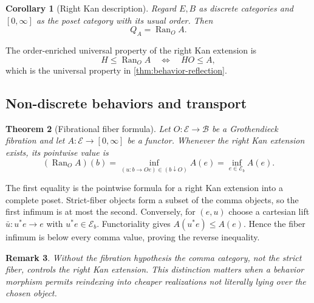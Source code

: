\documentclass[12pt,a4paper,twoside]{extarticle}
\makeatletter
\theoremstyle{compactplain}
\newtheorem{theorem}{Theorem}[section]
\newtheorem{corollary}[theorem]{Corollary}
\theoremstyle{compactdef}
\newtheorem{remark}[theorem]{Remark}
\renewenvironment{proof}[1][\proofname]{\par\pushQED{\qed}\normalfont
  \topsep2pt\trivlist\item[\hskip\labelsep\bfseries #1\@addpunct{.}]\ignorespaces}
 {\popQED\endtrivlist\@endpefalse}
\newcommand{\Ran}{\operatorname{Ran}}
\makeatother
\begin{document}
\begin{corollary}[Right Kan description]
Regard $E,B$ as discrete categories and $[0,\infty]$ as the poset category with its usual order.  Then
\[
  Q_A=\Ran_O A.
\]
\end{corollary}
\begin{proof}
The order-enriched universal property of the right Kan extension is
\[
  H\le\Ran_OA\quad\Longleftrightarrow\quad HO\le A,
\]
which is the universal property in \cref{thm:behavior-reflection}.
\end{proof}

\subsection{Non-discrete behaviors and transport}
\begin{theorem}[Fibrational fiber formula]\label{thm:fibrational-reflection}
Let $O:\mathcal E\to\mathcal B$ be a Grothendieck fibration and let $A:\mathcal E\to[0,\infty]$ be a functor.  Whenever the right Kan extension exists, its pointwise value is
\[
 (\Ran_OA)(b)
 =\inf_{(u:b\to Oe)\in(b\downarrow O)}A(e)
 =\inf_{e\in\mathcal E_b}A(e).
\]
\end{theorem}
\begin{proof}
The first equality is the pointwise formula for a right Kan extension into a complete poset.  Strict-fiber objects form a subset of the comma objects, so the first infimum is at most the second.  Conversely, for $(e,u)$ choose a cartesian lift $\bar u:u^*e\to e$ with $u^*e\in\mathcal E_b$.  Functoriality gives $A(u^*e)\le A(e)$.  Hence the fiber infimum is below every comma value, proving the reverse inequality.
\end{proof}

\begin{remark}
Without the fibration hypothesis the comma category, not the strict fiber, controls the right Kan extension.  This distinction matters when a behavior morphism permits reindexing into cheaper realizations not literally lying over the chosen object.
\end{remark}
\end{document}
